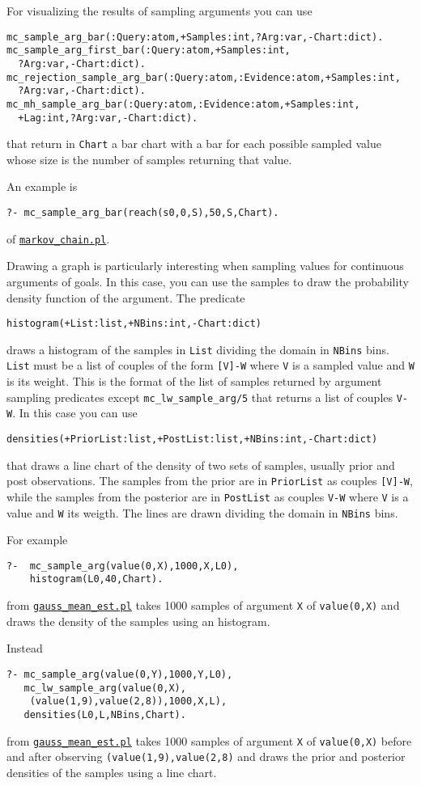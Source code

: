 For visualizing the results of sampling arguments you can use
\begin{verbatim}
mc_sample_arg_bar(:Query:atom,+Samples:int,?Arg:var,-Chart:dict).
mc_sample_arg_first_bar(:Query:atom,+Samples:int,
  ?Arg:var,-Chart:dict).
mc_rejection_sample_arg_bar(:Query:atom,:Evidence:atom,+Samples:int,
  ?Arg:var,-Chart:dict).
mc_mh_sample_arg_bar(:Query:atom,:Evidence:atom,+Samples:int,
  +Lag:int,?Arg:var,-Chart:dict).
\end{verbatim} 
that return in \verb|Chart| a bar chart with a bar for each possible sampled value whose size is the number of samples
returning that value.

An example is
\begin{verbatim}
?- mc_sample_arg_bar(reach(s0,0,S),50,S,Chart). 
\end{verbatim}
of \href{http://cplint.lamping.unife.it/example/inference/markov_chain.pl}{\texttt{markov\_chain.pl}}.

Drawing a graph is particularly interesting when
sampling values for continuous arguments of goals.
In this case, you can use the samples to draw the
probability density function of the argument.
The predicate
\begin{verbatim}
histogram(+List:list,+NBins:int,-Chart:dict) 
\end{verbatim}
draws a histogram of the samples in \verb|List| dividing the domain in
 \verb|NBins| bins.
\verb|List| must be a list of couples of the form \verb|[V]-W|
where \verb|V| is a sampled value and \verb|W| is its weight. This is the format of the list of samples returned by argument sampling predicates
except \verb|mc_lw_sample_arg/5| that returns a list of couples \verb|V-W|. 
In this case you can
use
\begin{verbatim}
densities(+PriorList:list,+PostList:list,+NBins:int,-Chart:dict)
\end{verbatim}
that draws a line chart of the density of two sets of samples, usually
 prior and post observations. The samples from the prior are in \verb|PriorList|
as couples \verb|[V]-W|, while the samples from the posterior are in \verb|PostList|
as couples \verb|V-W| where \verb|V| is a value and \verb|W| its weigth.
 The lines are drawn dividing the domain in
 \verb|NBins| bins.
 
For example
\begin{verbatim}
?-  mc_sample_arg(value(0,X),1000,X,L0),
    histogram(L0,40,Chart).
\end{verbatim}
from \href{http://cplint.lamping.unife.it/example/inference/gauss_mean_est.pl}{\texttt{gauss\_mean\_est.pl}}
takes 1000 samples of argument \verb|X| of \verb|value(0,X)| and draws the density of the samples using an histogram.

Instead
\begin{verbatim}
?- mc_sample_arg(value(0,Y),1000,Y,L0),
   mc_lw_sample_arg(value(0,X),
    (value(1,9),value(2,8)),1000,X,L),
   densities(L0,L,NBins,Chart).
\end{verbatim}
from \href{http://cplint.lamping.unife.it/example/inference/gauss_mean_est.pl}{\texttt{gauss\_mean\_est.pl}}
takes 1000 samples of argument \verb|X| of \verb|value(0,X)| before and after observing
\verb|(value(1,9),value(2,8)| and draws the prior and posterior densities of the samples using a line chart.
